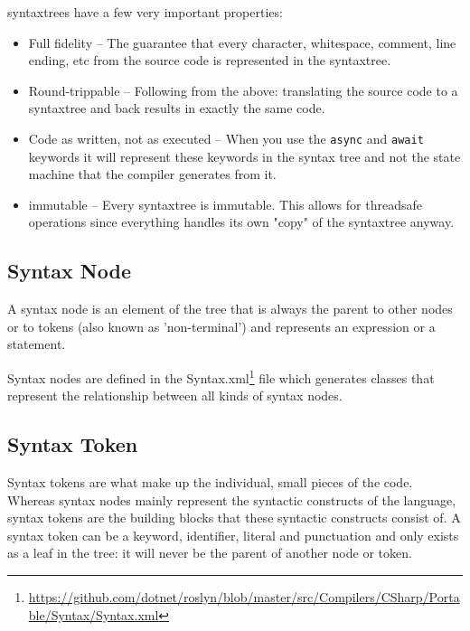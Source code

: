 \begin{minipage}{\linewidth}
\Glspl{syntaxtree} have a few very important properties:

\begin{itemize}
	\item Full fidelity -- The guarantee that every character, whitespace, comment, line ending, etc from the source code is represented in the \gls{syntaxtree}.
	\item Round-trippable -- Following from the above: translating the source code to a \gls{syntaxtree} and back results in exactly the same code.
	\item Code as written, not as executed -- When you use the \texttt{async} and \texttt{await} keywords it will represent these keywords in the syntax tree and not the state machine that the compiler generates from it.
	\item \gls{immutable} -- Every \gls{syntaxtree} is immutable. This allows for \gls{threadsafe} operations since everything handles its own "copy" of the \gls{syntaxtree} anyway.
\end{itemize}
\end{minipage}

\subsection{Syntax Node}
\label{sec:syntax-node}

A syntax node is an element of the tree that is always the parent to other nodes or to tokens (also known as 'non-terminal') and represents an expression or a statement. 

Syntax nodes are defined in the Syntax.xml\footnote{\url{https://github.com/dotnet/roslyn/blob/master/src/Compilers/CSharp/Portable/Syntax/Syntax.xml}} file which generates classes that represent the relationship between all kinds of syntax nodes. 

\subsection{Syntax Token}
\label{sec:syntax-token}

Syntax tokens are what make up the individual, small pieces of the code. Whereas syntax nodes mainly represent the syntactic constructs of the language, syntax tokens are the building blocks that these syntactic constructs consist of.
A syntax token can be a keyword, identifier, literal and punctuation and only exists as a leaf in the tree: it will never be the parent of another node or token.

